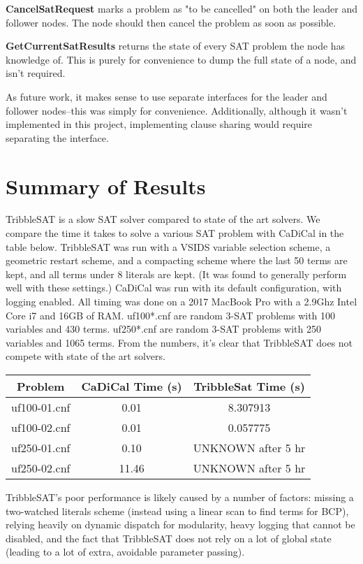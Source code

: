 \documentclass[10pt]{article}
\begin{document}
	\textbf{CancelSatRequest} marks a problem as "to be cancelled" on both the leader and follower nodes.  The node should then cancel the problem as soon as possible.
  	
	\textbf{GetCurrentSatResults} returns the state of every SAT problem the node has knowledge of.  This is purely for convenience to dump the full state of a node, and isn't required.
	
  As future work, it makes sense to use separate interfaces for the leader and follower nodes--this was simply for convenience.  Additionally, although it wasn't implemented in this project, implementing
  clause sharing would require separating the interface.

\section{Summary of Results}

  TribbleSAT is a slow SAT solver compared to state of the art solvers.  We compare the time it takes to solve a various SAT problem with CaDiCal in the table below.  TribbleSAT was run with a VSIDS variable selection
  scheme, a geometric restart scheme, and a compacting scheme where the last 50 terms are kept, and all terms under 8 literals are kept.  (It was found to generally perform well with these settings.)  CaDiCal was run with
  its default configuration, with logging enabled.  All timing was done on a 2017 MacBook Pro with a 2.9Ghz Intel Core i7 and 16GB of RAM.  uf100*.cnf are random 3-SAT problems with 100 variables and 430 terms.  uf250*.cnf
  are random 3-SAT problems with 250 variables and 1065 terms.  From the numbers, it's clear that TribbleSAT does not compete with state of the art solvers.
 
 \begin{center}
 \begin{tabular}{||c c c||} 
 \hline
 Problem & CaDiCal Time (s) & TribbleSat Time (s) \\ [0.5ex] 
 \hline\hline
 uf100-01.cnf & 0.01 &  8.307913 \\ 
 \hline
 uf100-02.cnf & 0.01 & 0.057775 \\ 
 \hline
 uf250-01.cnf & 0.10 &  UNKNOWN after 5 hr \\ 
 \hline
 uf250-02.cnf & 11.46 & UNKNOWN after 5 hr \\
 \hline
\end{tabular}
\end{center}
  
  TribbleSAT's poor performance is likely caused by a number of factors:  missing a two-watched literals scheme (instead using a linear scan to find terms for BCP), relying heavily on dynamic dispatch for modularity,
  heavy logging that cannot be disabled, and the fact that TribbleSAT does not rely on a lot of global state (leading to a lot of extra, avoidable parameter passing).
\end{document}
